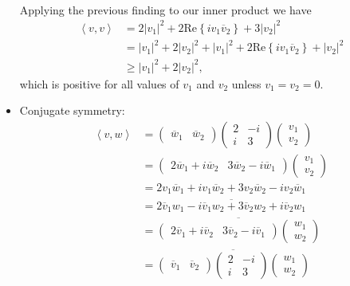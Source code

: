 \begin{questions}
\begin{solution}
\begin{itemize}
\begin{align*}
\end{align*}
Applying the previous finding to our inner product we have
\begin{align*}
\left<v,v\right>&=2|v_1|^2+2\text{Re}\left\lbrace iv_1\overline{v}_2 \right\rbrace+3|v_2|^2\\
&=|v_1|^2+2|v_2|^2+|v_1|^2+2\text{Re}\left\lbrace iv_1\overline{v}_2 \right\rbrace+|v_2|^2\\
&\geq |v_1|^2+2|v_2|^2,
\end{align*}
which is positive for all values of $v_1$ and $v_2$ unless $v_1=v_2=0$.
\item Conjugate symmetry:
\begin{align*}
\left<v,w\right>&=\begin{pmatrix}
\overline{w}_1&\overline{w}_2
\end{pmatrix}\begin{pmatrix}
2&-i\\i&3
\end{pmatrix}\begin{pmatrix}
v_1\\v_2
\end{pmatrix}\\
&=\begin{pmatrix}
2\overline{w}_1+i\overline{w}_2&3\overline{w}_2-i\overline{w}_1
\end{pmatrix}\begin{pmatrix}
v_1\\v_2
\end{pmatrix}\\
&=2v_1\overline{w}_1+iv_1\overline{w}_2+3v_2\overline{w}_2-iv_2\overline{w}_1\\
&=\overline{2\overline{v}_1w_1-i\overline{v}_1w_2+3\overline{v}_2w_2+i\overline{v}_2w_1}\\
&=\overline{\begin{pmatrix}2\overline{v}_1+i\overline{v}_2&3\overline{v}_2-i\overline{v}_1
\end{pmatrix}\begin{pmatrix}
w_1\\w_2
\end{pmatrix}}\\
&=\overline{\begin{pmatrix}
\overline{v}_1&\overline{v}_2\end{pmatrix}\begin{pmatrix}
2&-i\\i&3\end{pmatrix}\begin{pmatrix}
w_1\\w_2

\end{pmatrix}}
\end{align*}
\end{itemize}
\end{solution}
\end{questions}
